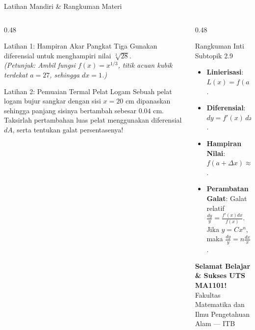 \documentclass[aspectratio=169,10pt]{beamer}
\begin{document}
\begin{frame}{Latihan Mandiri \& Rangkuman Materi}
    \begin{columns}[T]
        \begin{column}{0.48\textwidth}
            \begin{block}{Latihan 1: Hampiran Akar Pangkat Tiga}
                Gunakan diferensial untuk menghampiri nilai $\sqrt[3]{28}$.\\
                \textit{(Petunjuk: Ambil fungsi $f(x) = x^{1/3}$, titik acuan kubik terdekat $a = 27$, sehingga $dx = 1$.)}
            \end{block}

            \begin{block}{Latihan 2: Pemuaian Termal Pelat Logam}
                Sebuah pelat logam bujur sangkar dengan sisi $x = 20\text{ cm}$ dipanaskan sehingga panjang sisinya bertambah sebesar $0.04\text{ cm}$.
                Taksirlah pertambahan luas pelat menggunakan diferensial $dA$, serta tentukan galat persentasenya!
            \end{block}
        \end{column}

        \begin{column}{0.48\textwidth}
            \begin{alertblock}{Rangkuman Inti Subtopik 2.9}
                \begin{itemize}
                    \item \textbf{Linierisasi}: $L(x) = f(a) + f'(a)(x - a)$.
                    \item \textbf{Diferensial}: $dy = f'(x)\,dx$.
                    \item \textbf{Hampiran Nilai}: $f(a + \Delta x) \approx f(a) + dy$.
                    \item \textbf{Perambatan Galat}: Galat relatif $\frac{dy}{y} = \frac{f'(x)dx}{f(x)}$. Jika $y = C x^n$, maka $\frac{dy}{y} = n \frac{dx}{x}$.
                \end{itemize}
            \end{alertblock}

            \vspace{0.15cm}
            \centering
            {\small \textbf{Selamat Belajar \& Sukses UTS MA1101!}}\\
            {\scriptsize Fakultas Matematika dan Ilmu Pengetahuan Alam --- ITB}
        \end{column}
    \end{columns}
\end{frame}
\end{document}
